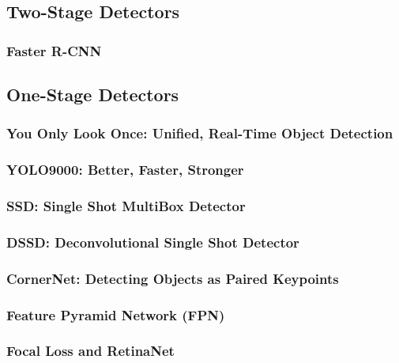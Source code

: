\documentclass[12pt, oneside]{article}
\begin{document}
\subsection{Two-Stage Detectors}

\subsubsection{Faster R-CNN}


\subsection{One-Stage Detectors}

\subsubsection{You Only Look Once: Unified, Real-Time Object Detection}


\subsubsection{YOLO9000: Better, Faster, Stronger}


\subsubsection{SSD: Single Shot MultiBox Detector}


\subsubsection{DSSD: Deconvolutional Single Shot Detector}


\subsubsection{CornerNet: Detecting Objects as Paired Keypoints}


\subsubsection{Feature Pyramid Network (FPN)}
\label{sec:fpnref}


\subsubsection{Focal Loss and RetinaNet}

\end{document}
